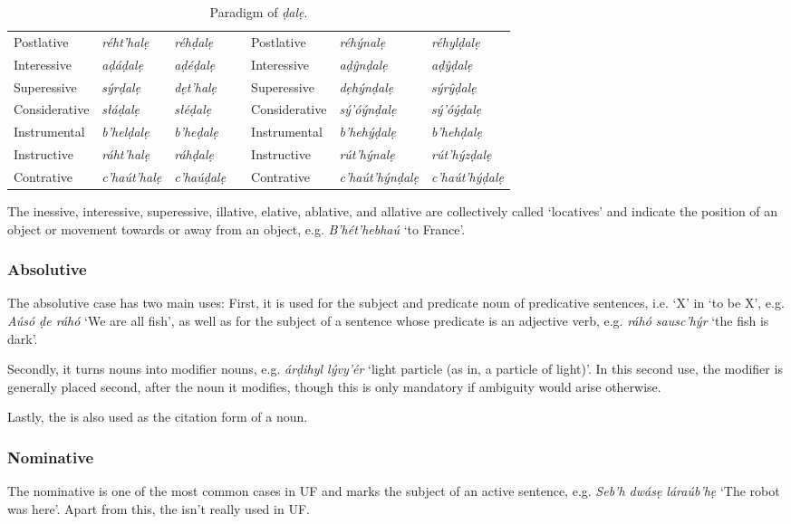 \documentclass[a4paper, 12pt, twoside, final]{article}
\let \w \textit
\begin{document}
\begin{table}[H]
\begin{tabular}{l|>{\it}l|>{\it}lll|>{\it}l|>{\it}l}
Postlative    & réht’halẹ   & réhḍalẹ    && Postlative    & réhýnalẹ        & réhylḍalẹ   \\
Interessive   & aḍáḍalẹ     & aḍéḍalẹ    && Interessive   & aḍŷnḍalẹ        & aḍŷḍalẹ     \\
Superessive   & sýrḍalẹ     & dẹt’halẹ   && Superessive   & dẹhýnḍalẹ       & sýrŷḍalẹ    \\
Considerative & słáḍalẹ     & słéḍalẹ    && Considerative & sý’óýnḍalẹ      & sý’óýḍalẹ   \\
Instrumental  & b’helḍalẹ   & b’heḍalẹ   && Instrumental  & b’hehýḍalẹ      & b’hehḍalẹ   \\
Instructive   & ráht’halẹ   & ráhḍalẹ    && Instructive   & rút’hýnalẹ      & rút’hýzḍalẹ \\
Contrative    & c’haút’halẹ & c’haúḍalẹ  && Contrative    & c’haút’hýnḍalẹ  & c’haút’hýḍalẹ \\ %
\end{tabular}
\caption{Paradigm of \w{ḍalẹ}.}\label{tab:vocalic-declension}
\end{table}

\noindent
The inessive, interessive, superessive, illative, elative, ablative, and allative are collectively called ‘locatives’ and
indicate the position of an object or movement towards or away from an object, e.g. \w{B’hét’hebhaú} ‘to France’.

\subsubsection{Absolutive}
The absolutive case has two main uses: First, it is used for the subject and predicate noun of predicative sentences,
i.e. ‘X’ in ‘to be X’, e.g. \w{Aúsó ḍe ráhó} ‘We are all fish’, as well as for the subject of a sentence whose predicate
is an adjective verb, e.g. \w{ráhó sausc’hýr} ‘the fish is dark’.

Secondly, it turns nouns into modifier nouns, e.g.
\w{árḍihyl lývy’ér} ‘light particle (as in, a particle of light)’. In this second use, the modifier is generally
placed second, after the noun it modifies, though this is only mandatory if ambiguity would arise otherwise.

Lastly, the  is also used as the citation form of a noun.

\subsubsection{Nominative}
The nominative is one of the most common cases in UF and marks the subject of an active sentence, e.g.
\w{Seb’h dwásẹ láraúb’hẹ} ‘The robot was here’. Apart from this, the  isn’t really used in UF.
\end{document}
